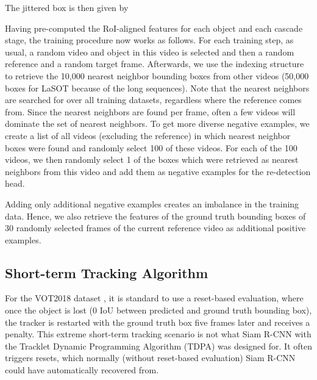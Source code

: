\documentclass[10pt,twocolumn,letterpaper]{article}
\newcommand{\PAR}[1]{\vskip1pt \noindent {\bf #1~}}
\begin{document}
The jittered box is then given by


\PAR{Training Procedure.}
Having pre-computed the RoI-aligned features for each object and each cascade stage, the training procedure now works as follows. 
For each training step, as usual, a random video and object in this video is selected and then a random reference and a random target frame. Afterwards, we use the indexing structure to retrieve the 10,000 nearest neighbor bounding boxes from other videos (50,000 boxes for LaSOT because of the  long sequences). Note that the nearest neighbors are searched for over all training datasets, regardless where the reference comes from. 
Since the nearest neighbors are found per frame, often a few videos will dominate the set of nearest neighbors. To get more diverse negative examples, we create a list of all videos (excluding the reference) in which nearest neighbor boxes were found and randomly select 100 of these videos. For each of the 100 videos, we then randomly select 1 of the boxes which were retrieved as nearest neighbors from this video and add them as negative examples for the re-detection head.

Adding only additional negative examples creates an imbalance in the training data. Hence, we also retrieve the features of the ground truth bounding boxes of 30 randomly selected frames of the current reference video as additional positive examples.

\subsection{Short-term Tracking Algorithm}
For the VOT2018 dataset \cite{Kristan18ECCVW}, it is standard to use a reset-based evaluation, where once the object is lost (0 IoU between predicted and ground truth bounding box), the tracker is restarted with the ground truth box five frames later and receives a penalty. This extreme short-term tracking scenario is not what Siam R-CNN with the Tracklet Dynamic Programming Algorithm (TDPA) was designed for. It often triggers resets, which normally (without reset-based evaluation) Siam R-CNN could have automatically recovered from.
\end{document}

